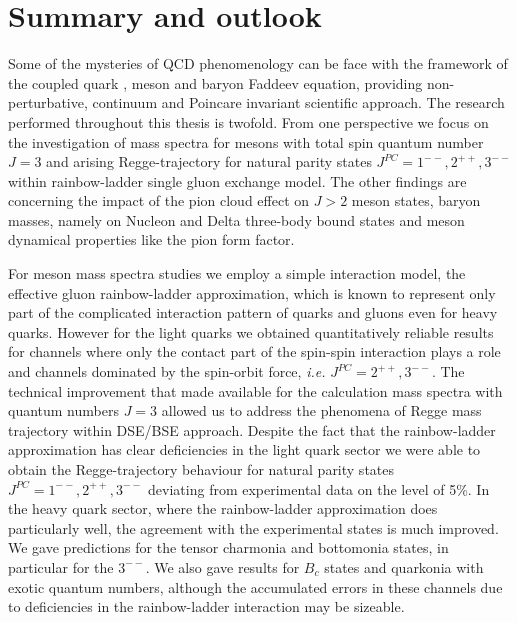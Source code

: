 \chapter{Summary and outlook}
\label{chap:sum}
\vspace{-1.0cm}
Some of the mysteries of QCD phenomenology can be face with the framework of the coupled quark \DSE, meson \BSE and baryon Faddeev equation, providing non-perturbative, continuum and Poincare invariant scientific approach. The research performed throughout this thesis is twofold. From one perspective we focus on the investigation of mass spectra for mesons with total spin quantum number $J=3$ and arising Regge-trajectory for natural parity states $J^{PC}=1^{--},2^{++},3^{--}$ within rainbow-ladder single gluon exchange model. The other findings are concerning the impact of the pion cloud effect on $J>2$ meson states, baryon masses, namely on Nucleon and Delta three-body bound states and meson dynamical properties like the pion form factor.\\
\vspace{-0.3cm}

For meson mass spectra studies we employ a simple interaction model, the effective gluon rainbow-ladder
approximation, which is known to represent only part of the complicated interaction pattern of quarks and gluons even for heavy quarks. However for the light quarks we obtained quantitatively reliable results for channels where only the contact part of the spin-spin interaction plays a role and channels dominated by the spin-orbit force, {\it i.e.} $J^{PC}= 2^{++}, 3^{--}$. The technical improvement that made available for the calculation mass spectra with quantum numbers $J=3$ allowed us to address the phenomena of Regge mass trajectory within DSE/BSE approach. Despite the fact that the rainbow-ladder approximation has clear deficiencies in the light quark sector we were able to obtain the Regge-trajectory behaviour for natural parity states $J^{PC}=1^{--},2^{++},3^{--}$ deviating from experimental data on the level of 5\%. In the heavy quark sector, where the rainbow-ladder approximation does particularly well, the agreement with the experimental states is much improved. We gave predictions for the tensor charmonia and bottomonia states, in particular for the $3^{--}$. We also gave results for $B_c$ states and quarkonia with exotic quantum numbers, although the accumulated errors in these channels due to deficiencies in the rainbow-ladder interaction may be sizeable.\\
\vspace{-0.3cm}

